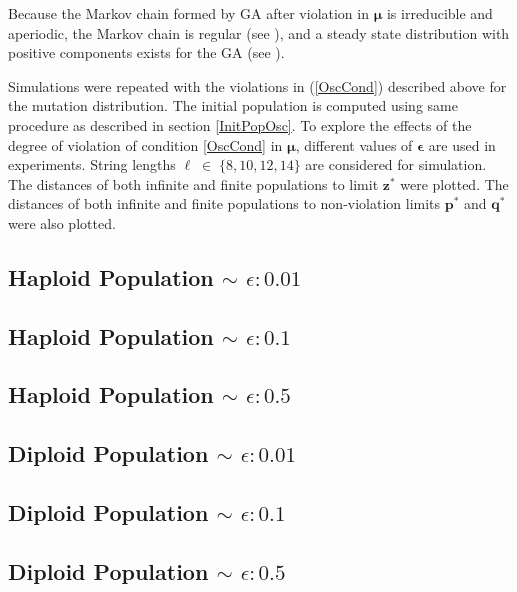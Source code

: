 Because the Markov chain formed by GA after violation in $\bm{\mu}$ is irreducible and aperiodic, 
the Markov chain is regular (see \cite{Iosifescu1980}), and a steady state distribution 
with positive components exists for the GA (see \cite{Minc1988}).   

Simulations were repeated with the violations in (\ref{OscCond}) described above for the mutation distribution. 
The initial population is 
computed using same procedure as described in section \ref{InitPopOsc}. To explore the effects of the degree  
of violation of condition \ref{OscCond} in $\bm{\mu}$, different values of $\bm{\epsilon}$ are used in experiments. 
String lengths $\ell \;\in\; \{8, 10, 12, 14\}$ are considered for simulation.
The distances of both infinite and finite populations to limit $\bm{z}^\ast$ were plotted. 
The distances of both infinite and finite populations to non-violation limits $\bm{p}^\ast$ and $\bm{q}^\ast$ were also plotted.

\subsection{Haploid Population $\mathtt{\sim}$ $\epsilon: 0.01$}

\subsection{Haploid Population $\mathtt{\sim}$ $\epsilon: 0.1$}

\subsection{Haploid Population $\mathtt{\sim}$ $\epsilon: 0.5$}

\clearpage
\subsection{Diploid Population $\mathtt{\sim}$ $\epsilon: 0.01$}

\subsection{Diploid Population $\mathtt{\sim}$ $\epsilon: 0.1$}

\subsection{Diploid Population $\mathtt{\sim}$ $\epsilon: 0.5$}



